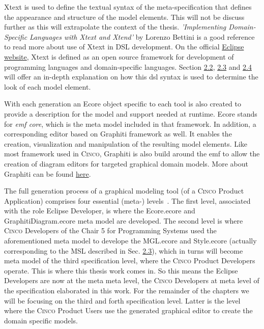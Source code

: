 Xtext is used to define the textual syntax of the meta-specification that defines the appearance and structure of the model elements. This will not be discuss further as this will extrapolate the context of the thesis.  \textit{'Implementing Domain-Specific Languages with Xtext and Xtend'} by Lorenzo Bettini is a good reference to read more about use of Xtext in DSL development. On the official \href{https://www.eclipse.org/Xtext/}{Eclipse website}, Xtext is defined as an open source framework for development of programming languages and domain-specific languages. Section \hyperref[sec:MGL]{2.2}, \hyperref[sec:MSL]{2.3} and \hyperref[sec:CPD]{2.4} will offer an in-depth explanation on how this \acrshort{dsl} syntax is used to determine the look of each model element.

With each generation an Ecore object specific to each tool is also created to provide a description for the model and support needed at runtime. Ecore stands for \textit{\acrfull{emf} core}, which is the meta model included in that framework. In addition, a corresponding editor based on Graphiti framework as well. It enables the creation, visualization and manipulation of the resulting model elements. Like most framework used in \textsc{Cinco}, Graphiti is also build around the \acrshort{emf} to allow the creation of diagram editors for targeted graphical domain models. More about Graphiti can be found \href{https://www.eclipse.org/graphiti/}{here}.

The full generation process of a graphical modeling tool (of a \textsc{Cinco} Product Application) comprises four essential (meta-) levels~\cite{Naujokat2018}. The first level, associated with the role Eclipse Developer, is where the Ecore.ecore and GraphitiDiagram.ecore meta model are developed. The second level is where \textsc{Cinco} Developers of the Chair 5 for Programming Systems used the aforementioned meta model to develope the MGL.ecore and Style.ecore (actually corresponding to the MSL described in Sec. \hyperref[sec:MSL]{2.3}), which in turns will become meta model of the third specification level, where the \textsc{Cinco} Product Developers operate. This is where this thesis work comes in. So this means the Eclipse Developers are now at the meta meta level, the \textsc{Cinco} Developers at meta level of the specification elaborated in this work. For the remainder of the chapters we will be focusing on the third and forth specification level. Latter is the level where the \textsc{Cinco} Product Users use the generated graphical editor to create the domain specific models. 

